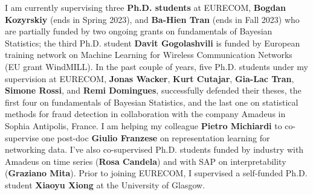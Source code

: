 \documentclass[oneside, a4paper, onecolumn, 10pt]{article}
\begin{document}
I am currently supervising three {\bf Ph.D. students} at EURECOM, {\bf Bogdan Kozyrskiy} (ends in Spring 2023), and {\bf Ba-Hien Tran} (ends in Fall 2023) who are partially funded by two ongoing grants on fundamentals of Bayesian Statistics; the third Ph.D. student {\bf Davit Gogolashvili} is funded by European training network on Machine Learning for Wireless Communication Networks (EU grant WindMILL).
In the past couple of years, five Ph.D. students under my supervision at EURECOM, {\bf Jonas Wacker}, {\bf Kurt Cutajar}, {\bf Gia-Lac Tran}, {\bf Simone Rossi}, and {\bf Remi Domingues}, successfully defended their theses, the first four on fundamentals of Bayesian Statistics, and the last one on statistical methods for fraud detection in collaboration with the company Amadeus in Sophia Antipolis, France. 
I am helping my colleague {\bf Pietro Michiardi} to co-supervise one post-doc {\bf Giulio Franzese} on representation learning for networking data.
I've also co-supervised Ph.D. students funded by industry with Amadeus on time series ({\bf Rosa Candela}) and with SAP on interpretability ({\bf Graziano Mita}). %
Prior to joining EURECOM, I supervised a self-funded Ph.D. student {\bf Xiaoyu Xiong} at the University of Glasgow.

\end{document}
